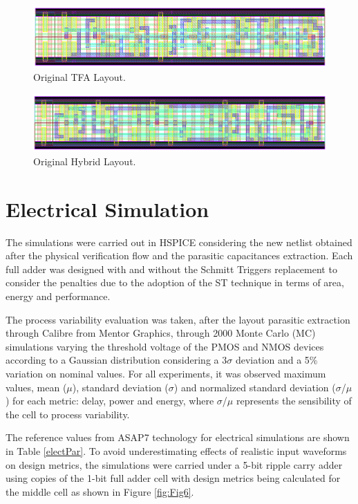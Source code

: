 \documentclass[ecp,tc, english]{iiufrgs}
\begin{document}
\begin{figure}[H]
\centering
\includegraphics[width=\textwidth]{TFA.png}
\caption{Original TFA Layout.}
\label{fig:TFA}
\end{figure}

\begin{figure}[H]
\centering
\includegraphics[width=\textwidth]{HYBRID.png}
\caption{Original Hybrid Layout.}
\label{fig:HYBRID}
\end{figure}

\section{Electrical Simulation}

The simulations were carried out in HSPICE considering the new netlist obtained after the physical verification flow and the parasitic capacitances extraction. Each full adder was designed with and without the Schmitt Triggers replacement to consider the penalties due to the adoption of the ST technique in terms of area, energy and performance.

The process variability evaluation was taken, after the layout parasitic extraction through Calibre\textregistered{} from Mentor Graphics, through 2000 Monte Carlo (MC) simulations varying the threshold voltage of the PMOS and NMOS devices according to a Gaussian distribution considering a 3\(\sigma\) deviation and a 5\% variation on nominal values. For all experiments, it was observed maximum values, mean (\(\mu\)), standard deviation (\(\sigma\)) and normalized standard deviation (\(\sigma\)/\(\mu\)) for each metric: delay, power and energy, where \(\sigma\)/\(\mu\) represents the sensibility of the cell to process variability. 

The reference values from ASAP7 technology for electrical simulations are shown in Table \ref{electPar}. To avoid underestimating effects of realistic input waveforms on design metrics, the simulations were carried under a 5-bit ripple carry adder using copies of the 1-bit full adder cell with design metrics being calculated for the middle cell as shown in Figure \ref{fig:Fig6}. 
\end{document}
